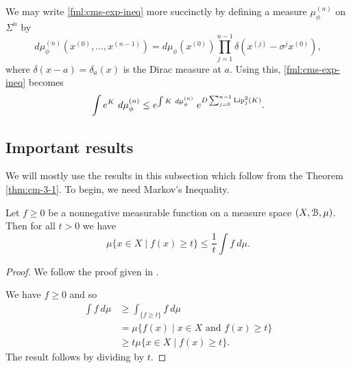 We may write \eqref{fml:cms-exp-ineq} more succinctly by defining a measure $\mu_\phi^{(n)}$ on $\Sigma^n$ by
\[
	d\mu_\phi^{(n)}(x^{(0)}, \dots, x^{(n - 1)}) = d\mu_\phi(x^{(0)}) \prod_{j = 1}^{n - 1}{\delta(x^{(j)} - \sigma^j{x^{(0)}})},
\]
where $\delta(x - a) = \delta_a(x)$ is the Dirac measure at $a$. Using this, \eqref{fml:cms-exp-ineq} becomes
\[
	\int{e^K\ d\mu_\phi^{(n)}} \leq e^{\int{K\ d\mu_\phi^{(n)}}} \; e^{D \sum_{j = 0}^{n - 1}{\Lip_j^2(K)}}.
\]

\subsection{Important results}
We will mostly use the results in this subsection which follow from the Theorem \ref{thm:cm-3-1}. To begin, we need Markov's Inequality.

\begin{lemma}\label{lem:markov-ineq}
	Let $f \geq 0$ be a nonnegative measurable function on a measure space $(X, \mathcal{B}, \mu)$. Then for all $t > 0$ we have
	\[
		\mu\{x \in X \mid f(x) \geq t\} \leq \frac{1}{t}\int{f\ d\mu}.
	\]
	
	\begin{proof}
		We follow the proof given in \cite[Theorem 3.1.1]{athreya-lahiri:measure-theory}.
		
		We have $f \geq 0$ and so
		\begin{align*}
			\int{f\ d\mu} &\geq \int_{\{f \geq t\}}{f\ d\mu} \\ &= \mu\{f(x) \mid x \in X \text{ and } f(x) \geq t \} \\ &\geq t\mu\{x \in X \mid f(x) \geq t \}.
		\end{align*}
		The result follows by dividing by $t$.
	\end{proof}
\end{lemma}

